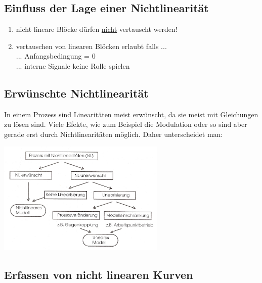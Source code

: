 	
	
	\subsection{Einfluss der Lage einer Nichtlinearität}
		\begin{enumerate}
			\item	nicht lineare Blöcke dürfen \underline{nicht} vertauscht werden!\\			
			\item vertauschen von linearen Blöcken erlaubt falls ...\\
								... Anfangsbedingung = 0\\
								... interne Signale keine Rolle spielen
		\end{enumerate}
	  	
	\subsection{Erwünschte Nichtlinearität }
		In einem Prozess sind Linearitäten meist erwünscht, da sie meist mit
		Gleichungen zu lösen sind.
		Viele Efekte, wie zum Beispiel die Modulation oder so sind aber gerade erst
		durch Nichtlinearitäten möglich. Daher unterscheidet man:\\
	\begin{minipage}[c]{8cm}
		\includegraphics[width=8cm]{./bilder/Liste_Nichtlinearitaeten.jpg}
	\end{minipage}

		

\newpage
	
\subsection{Erfassen von nicht linearen Kurven}
